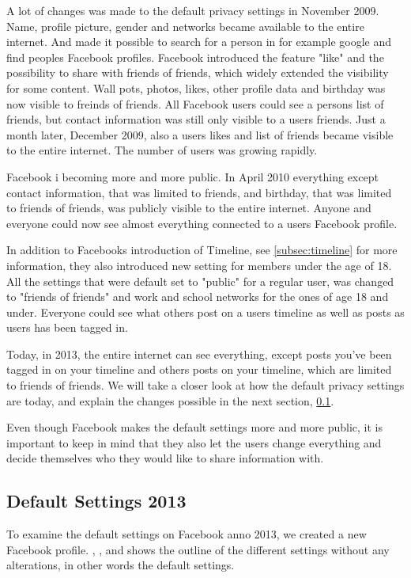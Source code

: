 A lot of changes was made to the default privacy settings in November 2009. Name, profile picture, gender and networks became available to the entire internet. And made it possible to search for a person in for example google and find peoples Facebook profiles. Facebook introduced the feature "like" and the possibility to share with friends of friends, which widely extended the visibility for some content. Wall pots, photos, likes, other profile data and birthday was now visible to freinds of friends. All Facebook users could see a persons list of friends, but contact information was still only visible to a users friends. Just a month later, December 2009, also a users likes and list of friends became visible to the entire internet. The number of users was growing rapidly.

Facebook i becoming more and more public. In April 2010 everything except contact information, that was limited to friends, and birthday, that was limited to friends of friends, was publicly visible to the entire internet. Anyone and everyone could now see almost everything connected to a users Facebook profile. 

In addition to Facebooks introduction of Timeline, see \ref{subsec:timeline} for more information, they also introduced new setting for members under the age of 18. All the settings that were default set to "public" for a regular user, was changed to "friends of friends" and work and school networks for the ones of age 18 and under. Everyone could see what others post on a users timeline as well as posts as users has been tagged in.

Today, in 2013, the entire internet can see everything,  except posts you've been tagged in on your timeline and others posts on your timeline, which are limited to friends of friends. We will take a closer look at how the default privacy settings are today, and explain the changes possible in the next section, \ref{subsec:default2013}. 

Even though Facebook makes the default settings more and more public, it is important to keep in mind that they also let the users change everything and decide themselves who they would like to share information with.   


\subsection{Default Settings 2013}
\label{subsec:default2013}

To examine the default settings on Facebook anno 2013, we created a new Facebook profile. , ,  and  shows the outline of the different settings without any alterations, in other words the default settings. 

